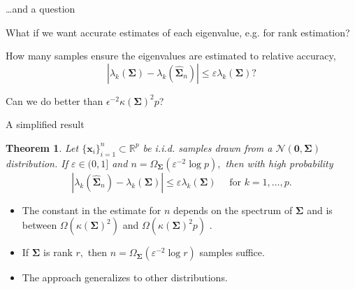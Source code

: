 \documentclass[xcolor={svgnames,pdftex,dvipsnames,table},10pt]{beamer} %
\newcommand{\mat}[1]{\ensuremath{\mathbf{#1}}}
\newcommand{\R}{\ensuremath{\mathbb{R}}}
\newtheorem*{thm}{Theorem}
\begin{document}
\begin{frame}{\dots and a question}

What if we want accurate estimates of each eigenvalue, e.g. for rank estimation?

\begin{displaybox}{0.7\textwidth}
\parbox{\textwidth}{%
How many samples ensure the eigenvalues are estimated to relative accuracy,
\[
|\lambda_k(\mat{\Sigma}) - \lambda_k(\widehat{\mat{\Sigma}}_n)| \leq \varepsilon \lambda_k(\mat{\Sigma})?
\]
}
\end{displaybox}

Can we do better than $\epsilon^{-2} \kappa(\mat{\Sigma})^2 p$?

\end{frame}

\begin{frame}{A simplified result}

\begin{thm}
Let $\{\mat{x}_i\}_{i=1}^n \subset \R^p$ be i.i.d. samples drawn from a $\mathcal{N}(\mat{0}, \mat{\Sigma})$ distribution. 
If $\varepsilon \in (0, 1]$ and $n = \Omega_{\mat{\Sigma}}(\varepsilon^{-2} \log p),$ then with high probability
\[
|\lambda_k(\widehat{\mat{\Sigma}}_n) - \lambda_k(\mat{\Sigma})| \leq \varepsilon \lambda_k(\mat{\Sigma}) \quad \text{ for } k=1,\ldots,p.
\]
\end{thm}
\begin{itemize}
	\item The constant in the estimate for $n$ depends on the spectrum of $\mat{\Sigma}$ and is between $\Omega(\kappa(\mat{\Sigma})^2)$ and $\Omega(\kappa(\mat{\Sigma})^2 p)$ .
	\item If $\mat{\Sigma}$ is rank $r,$ then $n= \Omega_{\mat{\Sigma}}(\varepsilon^{-2} \log r)$ samples suffice.
	\item The approach generalizes to other distributions.
\end{itemize}
\end{frame}
\end{document}

